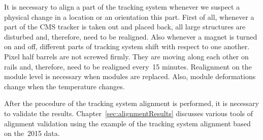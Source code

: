 It is necessary to align a part of the tracking system whenever we suspect a physical change in a location or an orientation this part. First of all, whenever a part of the CMS tracker is taken out and placed back, all large structures are disturbed and, therefore, need to be realigned. Also whenever a magnet is turned on and off, different parts of tracking system shift with respect to one another. Pixel half barrels are not screwed firmly. They are moving along each other on rails and, therefore, need to be realigned every~15 minutes. Realignment on the module level is necessary when modules are replaced. Also, module deformations change when the temperature changes. 

After the procedure of the tracking system alignment is performed, it is necessary to validate the results. Chapter~\ref{sec:alignmentResults} discusses various tools of alignment validation using the example of the tracking system alignment based on the~2015 data.   


